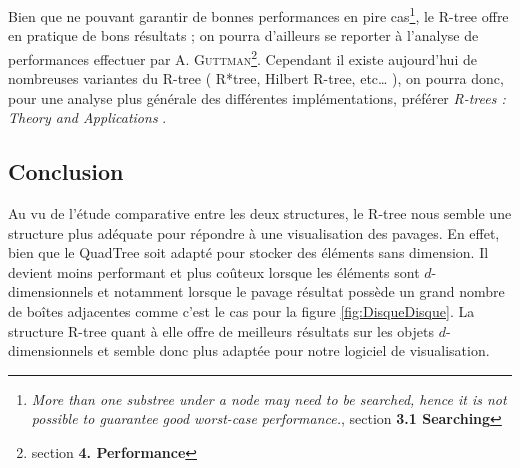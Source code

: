  Bien que ne pouvant garantir de bonnes performances en pire cas\footnote{\og \emph{More than one substree under a node may need to be searched, hence it is not possible to guarantee good worst-case performance.}\fg{}\cite{Guttman}, section \textbf{3.1 Searching}}, le R-tree offre en pratique de bons résultats ; on pourra d'ailleurs se reporter à l'analyse de performances effectuer par A. \textsc{Guttman}\footnote{section \textbf{4. Performance}\cite{Guttman}}. Cependant il existe aujourd'hui de nombreuses variantes du R-tree ( R*tree, Hilbert R-tree, etc\dots{} ), on pourra donc, pour une analyse plus générale des différentes implémentations, préférer \og\emph{R-trees : Theory and Applications} \fg{}\cite{poulos}.

\subsection{Conclusion}
Au vu de l'étude comparative entre les deux structures, le R-tree nous semble une structure plus adéquate pour répondre à une visualisation des pavages. En effet, bien que le QuadTree soit adapté pour stocker des éléments sans dimension. Il devient moins performant et plus coûteux lorsque les éléments sont $d$-dimensionnels et notamment lorsque le pavage résultat possède un grand nombre de boîtes adjacentes comme c'est le cas pour la figure \ref{fig:DisqueDisque}. La structure R-tree quant à elle offre de meilleurs résultats sur les objets $d$-dimensionnels et semble donc plus adaptée pour notre logiciel de visualisation.
